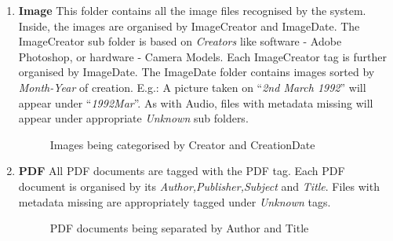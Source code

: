 \begin{enumerate}
\item \textbf{Image} \newline
This folder contains all the image files recognised by the system. Inside, the images are organised by ImageCreator and ImageDate. 
The ImageCreator sub folder is based on \textit{Creators} like software - Adobe Photoshop, or hardware - Camera Models. Each ImageCreator tag is further organised by ImageDate. 
The ImageDate folder contains images sorted by \textit{Month-Year} of creation. E.g.: A picture taken on ``\textit{2nd March 1992}'' will appear under ``\textit{1992Mar}''.
As with Audio, files with metadata missing will appear under appropriate \textit{Unknown} sub folders.
\begin{figure}[htb]
\centering
\setlength\fboxsep{0pt}
\setlength\fboxrule{0.5pt}
\caption{Images being categorised by Creator and CreationDate}
\label{fig:dfd0}
\end{figure}

\item \textbf{PDF} \newline
All PDF documents are tagged with the PDF tag. Each PDF document is organised by its \textit{Author,Publisher,Subject} and \textit{Title}. Files with metadata missing are appropriately tagged under \textit{Unknown} tags.
\begin{figure}[htb]
\centering
\setlength\fboxsep{0pt}
\setlength\fboxrule{0.5pt}
\caption{PDF documents being separated by Author and Title}
\label{fig:dfd0}
\end{figure}


\end{enumerate}
